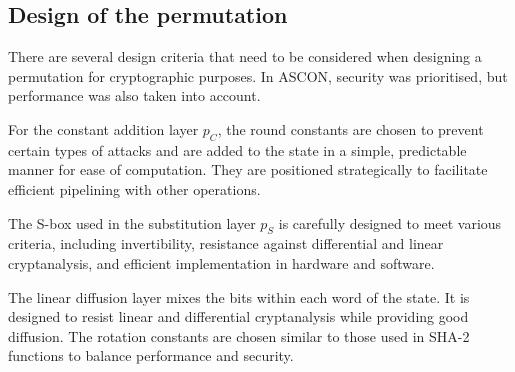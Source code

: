 \subsection{Design of the permutation}

There are several design criteria that need to be considered when designing a permutation for cryptographic purposes. In ASCON, security was prioritised, but performance was also taken into account. \par

For the constant addition layer $p_C$, the round constants are chosen to prevent certain types of attacks and are added to the state in a simple, predictable manner for ease of computation. They are positioned strategically to facilitate efficient pipelining with other operations. \par

The S-box used in the substitution layer $p_S$ is carefully designed to meet various criteria, including invertibility, resistance against differential and linear cryptanalysis, and efficient implementation in hardware and software. \par

The linear diffusion layer mixes the bits within each word of the state. It is designed to resist linear and differential cryptanalysis while providing good diffusion. The rotation constants are chosen similar to those used in SHA-2 functions to balance performance and security. \cite{DBLP:journals/joc/DobraunigEMS21} \par




